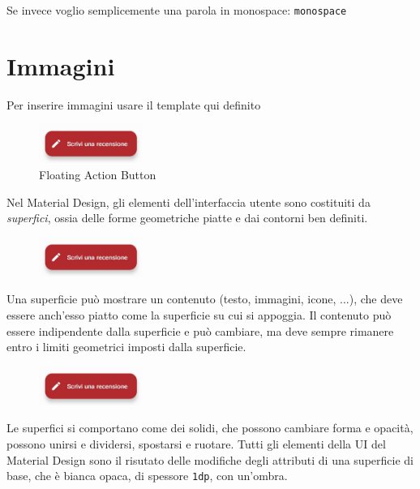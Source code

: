 \documentclass[12pt, a4paper]{report}
\begin{document}
	Se invece voglio semplicemente una parola in monospace: \texttt{monospace}
	
	\section{Immagini}
	Per inserire immagini usare il template qui definito
	
		\begin{figure}[h]
   			\centering
   			\includegraphics[width=0.3\textwidth]{elevation} %
 			\caption{Floating Action Button}
    			\label{fig:mesh1} %
		\end{figure}
		
	Nel Material Design, gli elementi dell'interfaccia utente sono costituiti da \textit{superfici}, ossia delle forme geometriche piatte e dai contorni ben definiti.
	
		\begin{figure}
   			\centering
   			\includegraphics[width=0.3\textwidth]{elevation} %
		\end{figure}

		Una superficie può mostrare un contenuto (testo, immagini, icone, ...), che deve essere anch'esso piatto come la superficie su cui si appoggia. Il contenuto può essere indipendente dalla superficie e può cambiare, ma deve sempre rimanere entro i limiti geometrici imposti dalla superficie.
		
		\begin{figure}
   			\centering
   			\includegraphics[width=0.3\textwidth]{elevation} %
		\end{figure}

		
		Le superfici si comportano come dei solidi, che possono cambiare forma e opacità, possono unirsi e dividersi, spostarsi e ruotare. Tutti gli elementi della UI del Material Design sono il risutato delle modifiche degli attributi di una superficie di base, che è bianca opaca, di spessore \texttt{1dp}, con un'ombra.
		
\end{document}

